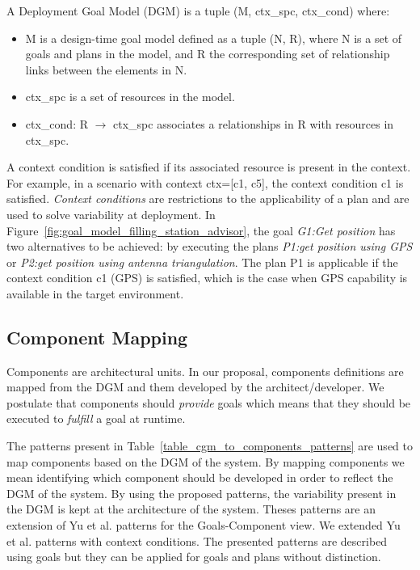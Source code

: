 \begin{defn}

  A Deployment Goal Model (DGM) is a tuple (M, ctx\_spc, ctx\_cond) where:

  \begin{itemize}
    \item M is a design-time goal model\cite{dalpiaz_runtime_2013} defined as a tuple (N, R), where N is a set of goals and plans in the model, and R the corresponding set of relationship links between the elements in N.

    \item ctx\_spc is a set of resources in the model.

    \item ctx\_cond: R $\to$ ctx\_spc associates a relationships in R with resources in  ctx\_spc.
  \end{itemize}

\end{defn}

A context condition is satisfied if its associated resource is present in the context. For example, in a scenario with context ctx=[c1, c5], the context condition c1 is satisfied.
\emph{Context conditions} are restrictions to the applicability of a plan and are used to solve variability at deployment. In Figure~\ref{fig:goal_model_filling_station_advisor}, the goal \emph{G1:Get position} has two alternatives to be achieved: by executing the plans \emph{P1:get position using GPS}  or \emph{P2:get position using antenna triangulation}. The plan P1 is applicable if the context condition c1 (GPS) is satisfied, which is the case when GPS capability is available in the target environment.

\subsection{Component Mapping}
\label{sec:goals_components}

Components are architectural units. In our proposal, components definitions are mapped from the DGM and them developed by the architect/developer.
We postulate that components should \emph{provide} goals which means that they should be executed to \emph{fulfill} a goal at runtime.

The patterns present in Table~\ref{table_cgm_to_components_patterns} are used to map components based on the DGM of the system. By mapping components we mean identifying which component should be developed in order to reflect the DGM of the system. By using the proposed patterns, the variability present in the DGM is kept at the architecture of the system. Theses patterns are an extension of Yu et al.\cite{yu_goals_2008} patterns for the Goals-Component view. We extended Yu et al.\cite{yu_goals_2008} patterns with context conditions.
The presented patterns are described using goals but they can be applied for goals and plans without distinction.


